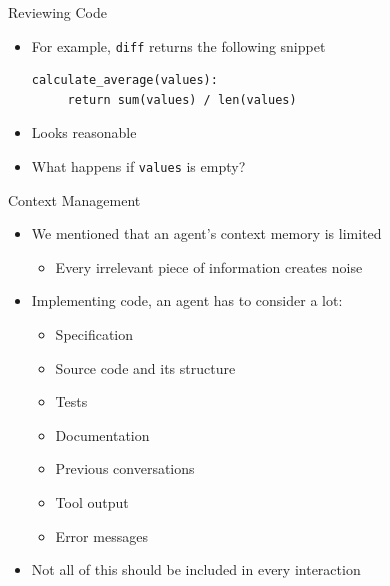 \documentclass[
ps,
]{prosper}
\begin{document}
\begin{slide}{Reviewing Code}

\begin{itemize}

\item For example, \texttt{diff} returns the following snippet

\begin{verbatim}
calculate_average(values):
     return sum(values) / len(values)
\end{verbatim}
  
\item Looks reasonable

\item What happens if \texttt{values} is empty?
  
\end{itemize}
  
\end{slide}



\begin{slide}{Context Management}

\begin{itemize}

\item We mentioned that an agent's context memory is limited

  \begin{itemize}

    \item Every irrelevant piece of information creates noise
    
  \end{itemize}
    
\item Implementing code, an agent has to consider a lot:

  \begin{itemize}
    
  \item Specification

  \item Source code and its structure

  \item Tests

  \item Documentation
    
  \item Previous conversations

  \item Tool output

  \item Error messages
    
  \end{itemize}

\item Not all of this should be included in every interaction
  
\end{itemize}
  
\end{slide}
\end{document}
